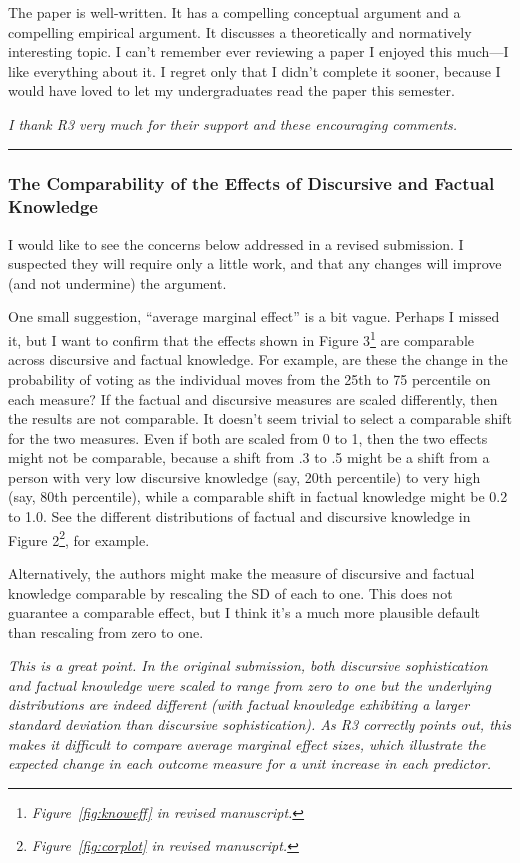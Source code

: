 The paper is well-written. It has a compelling conceptual argument and a compelling empirical argument. It discusses a theoretically and normatively interesting topic. I can’t remember ever reviewing a paper I enjoyed this much—I like everything about it. I regret only that I didn’t complete it sooner, because I would have loved to let my undergraduates read the paper this semester.

\textit{I thank R3 very much for their support and these encouraging comments.}

\rule{\linewidth}{.01cm}


\subsubsection*{The Comparability of the Effects of Discursive and Factual Knowledge}

I would like to see the concerns below addressed in a revised submission. I suspected they will require only a little work, and that any changes will improve (and not undermine) the argument. 

One small suggestion, ``average marginal effect'' is a bit vague. Perhaps I missed it, but I want to confirm that the effects shown in Figure 3\footnote{\textit{Figure~\ref{fig:knoweff} in revised manuscript.}} are comparable across discursive and factual knowledge. For example, are these the change in the probability of voting as the individual moves from the 25th to 75 percentile on each measure? If the factual and discursive measures are scaled differently, then the results are not comparable. It doesn’t seem trivial to select a comparable shift for the two measures. Even if both are scaled from 0 to 1, then the two effects might not be comparable, because a shift from .3 to .5 might be a shift from a person with very low discursive knowledge (say, 20th percentile) to very high (say, 80th percentile), while a comparable shift in factual knowledge might be 0.2 to 1.0. See the different distributions of factual and discursive knowledge in Figure 2\footnote{\textit{Figure~\ref{fig:corplot} in revised manuscript.}}, for example.

Alternatively, the authors might make the measure of discursive and factual knowledge comparable by rescaling the SD of each to one. This does not guarantee a comparable effect, but I think it’s a much more plausible default than rescaling from zero to one.

\textit{This is a great point. In the original submission, both discursive sophistication and factual knowledge were scaled to range from zero to one but the underlying distributions are indeed different (with factual knowledge exhibiting a larger standard deviation than discursive sophistication). As R3 correctly points out, this makes it difficult to compare average marginal effect sizes, which illustrate the expected change in each outcome measure for a unit increase in each predictor.}

